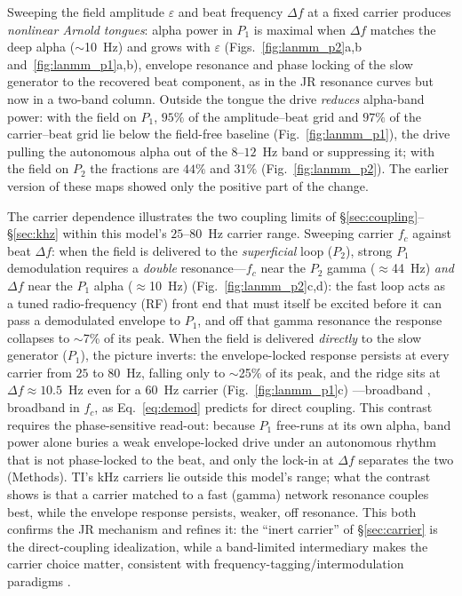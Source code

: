 \documentclass[11pt,a4paper]{article}
\providecommand{\DIFaddtex}[1]{{\protect\color{blue} \sf #1}} %
\providecommand{\DIFdeltex}[1]{{\protect\color{red} \scriptsize #1}} %
\providecommand{\DIFaddbegin}{} %
\providecommand{\DIFaddend}{} %
\providecommand{\DIFdelbegin}{} %
\providecommand{\DIFdelend}{} %
\providecommand{\DIFadd}[1]{\texorpdfstring{\DIFaddtex{#1}}{#1}} %
\providecommand{\DIFdel}[1]{\texorpdfstring{\DIFdeltex{#1}}{}} %
\begin{document}
Sweeping the field amplitude $\varepsilon$ and beat frequency $\Delta f$ at a fixed
carrier produces \emph{nonlinear Arnold tongues}: alpha power in $P_1$ is maximal
when $\Delta f$ matches the deep alpha ($\sim$10~Hz) and grows with $\varepsilon$
(Figs.~\ref{fig:lanmm_p2}a,b and~\ref{fig:lanmm_p1}a,b), envelope resonance and
phase locking of the slow generator to the recovered beat component, as in the
JR resonance curves but now in a two-band column. Outside the tongue the drive
\emph{reduces} alpha-band power: with the field on $P_1$, $95\%$ of the amplitude--beat
grid and $97\%$ of the carrier--beat grid lie below the field-free baseline
(Fig.~\ref{fig:lanmm_p1}), the drive pulling the autonomous alpha out of the $8$--$12$~Hz
band or suppressing it; with the field on $P_2$ the fractions are $44\%$ and $31\%$
(Fig.~\ref{fig:lanmm_p2}). The earlier version of these maps showed only the positive
part of the change.

The carrier dependence illustrates the two coupling
limits of \S\ref{sec:coupling}--\S\ref{sec:khz} within this model's $25$--$80$~Hz carrier
range. Sweeping carrier $f_c$ against
beat $\Delta f$: when the field is delivered to the \emph{superficial} loop
($P_2$), strong $P_1$ demodulation requires a \emph{double} resonance---$f_c$ near
the $P_2$ gamma ($\approx$44~Hz) \emph{and} $\Delta f$ near the $P_1$ alpha
($\approx$10~Hz) (Fig.~\ref{fig:lanmm_p2}c,d): the fast loop acts as a tuned
radio-frequency (RF) front end that must itself be excited before it can pass a demodulated
envelope to $P_1$, and off that gamma resonance the response collapses to
$\sim$7\% of its peak. When the field is delivered \emph{directly} to the slow
generator ($P_1$), the picture inverts: the envelope-locked response persists at
every carrier from $25$ to $80$~Hz, falling only to $\sim$25\% of its peak, and the
ridge sits at $\Delta f\!\approx\!10.5$~Hz even for a $60$~Hz carrier
(Fig.~\ref{fig:lanmm_p1}c)\DIFdelbegin \DIFdel{---broadband }\DIFdelend \DIFaddbegin \DIFadd{, broadband }\DIFaddend in $f_c$, as Eq.~\eqref{eq:demod} predicts for
direct coupling. This contrast requires the phase-sensitive read-out: because $P_1$
free-runs at its own alpha, band power alone buries a weak envelope-locked drive under
an autonomous rhythm that is not phase-locked to the beat, and only the lock-in at
$\Delta f$ separates the two (Methods). TI's kHz carriers lie outside this model's range; what the contrast shows is that a
carrier matched to a fast (gamma) network resonance couples best, while the envelope
response persists, weaker, off resonance. This both confirms the JR mechanism
and refines it: the ``inert carrier'' of \S\ref{sec:carrier} is the
direct-coupling idealization, while a band-limited intermediary makes the carrier
choice matter, consistent with frequency-tagging/intermodulation paradigms
\cite{gordon2019}.
\end{document}
